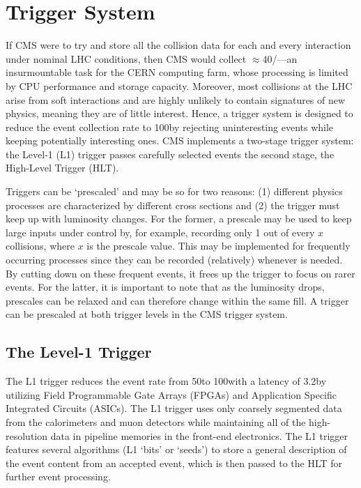 \section{Trigger System}
\label{sec:trigger}
If CMS were to try and store all the collision data for each and every interaction under nominal LHC conditions,
then CMS would collect $\approx$40\TB/\sndns---an insurmountable task for the CERN computing farm, whose processing is limited by CPU performance and storage capacity.
Moreover, most \pp collisions at the LHC arise from soft interactions and are highly unlikely to contain signatures of new physics, meaning they are of little interest.
Hence, a trigger system is designed to reduce the event collection rate to 100\KHz by rejecting uninteresting events while keeping potentially interesting ones.
CMS implements a two-stage trigger system: the Level-1 (L1) trigger passes carefully selected events the second stage, the High-Level Trigger (HLT).

Triggers can be `prescaled' and may be so for two reasons:
(1) different physics processes are characterized by different cross sections and
(2) the trigger must keep up with luminosity changes.
For the former, a prescale may be used to keep large inputs under control by, for example, recording only 1 out of every $x$ collisions, where $x$ is the prescale value.
This may be implemented for frequently occurring processes since they can be recorded (relatively) whenever is needed.
By cutting down on these frequent events, it frees up the trigger to focus on rarer events.
For the latter, it is important to note that as the luminosity drops, prescales can be relaxed and can therefore change within the same fill.
A trigger can be prescaled at both trigger levels in the CMS trigger system.

\subsection{The Level-1 Trigger}
\label{sec:L1_trig}
The L1 trigger reduces the event rate from 50\MHz to 100\KHz with a latency of 3.2\mus by utilizing Field Programmable Gate Arrays (FPGAs) and Application Specific Integrated Circuits (ASICs).
The L1 trigger uses only coarsely segmented data from the calorimeters and muon detectors while maintaining all of the high-resolution data in pipeline memories in the front-end electronics.
The L1 trigger features several algorithms (L1 `bits' or `seeds') to store a general description of the event content from an accepted event, which is then passed to the HLT for further event processing.

